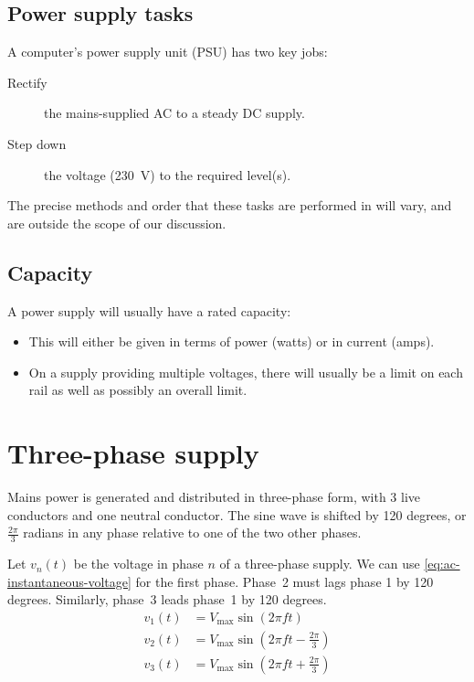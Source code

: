 \subsection{Power supply tasks}

A computer's power supply unit (PSU) has two key jobs:
\begin{description}
\item[Rectify] the mains-supplied AC to a steady DC supply.
\item[Step down] the voltage (\SI{230}{\volt}) to the required level(s).
\end{description}
The precise methods and order that these tasks are performed in will vary, and are outside the scope of our discussion.

\subsection{Capacity}

A power supply will usually have a rated capacity:
\begin{itemize}
\item This will either be given in terms of power (watts) or in current (amps).
\item On a supply providing multiple voltages, there will usually be a limit on each rail as well as possibly an overall limit.
\end{itemize}

\section{Three-phase supply}

Mains power is generated and distributed in three-phase form, with 3 live conductors and one neutral conductor.
The sine wave is shifted by 120 degrees, or $\frac{2\pi}{3}$ radians in any phase relative to one of the two other phases.


Let $v_n(t)$ be the voltage in phase $n$ of a three-phase supply.
We can use \autoref{eq:ac-instantaneous-voltage} for the first phase.
Phase~2 must lags phase 1 by 120 degrees.
Similarly, phase~3 leads phase~1 by 120 degrees.
\begin{align}
  v_1(t) & = V_{\mbox{max}} \sin ( 2 \pi f t ) \\
  v_2(t) & = V_{\mbox{max}} \sin \left ( 2 \pi f t - \frac{2\pi}{3} \right ) \\
  v_3(t) & = V_{\mbox{max}} \sin \left ( 2 \pi f t + \frac{2\pi}{3} \right )                      
\end{align}

